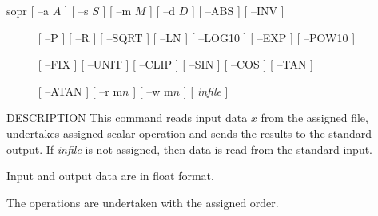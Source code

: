 % 
% 
% 
% 
%                                                                        
%

\begin{synopsis}
\item[sopr]   [ --a $A$ ] [ --s $S$ ] [ --m $M$ ] [ --d $D$ ] [ --ABS ] [ --INV ]
\item[\ ~~~~]  [ --P ] [ --R ] [ --SQRT ] [ --LN ] [ --LOG10 ] [ --EXP ] [ --POW10 ] 
\item[\ ~~~~] [ --FIX ] [ --UNIT ] [ --CLIP ] [ --SIN ] [ --COS ] [ --TAN ] 
\item[\ ~~~~] [ --ATAN ] [ --r m$n$ ] [ --w m$n$ ] [ {\em infile} ]
\end{synopsis}

\begin{qsection}{DESCRIPTION}
This command reads input data $x$ from the assigned file,
undertakes assigned scalar operation and
sends the results to the standard output.
If {\em infile} is not assigned,
then data is read from the standard input.
\par
Input and output data are in float format.
\par
The operations are undertaken with the assigned order.
\end{qsection}

